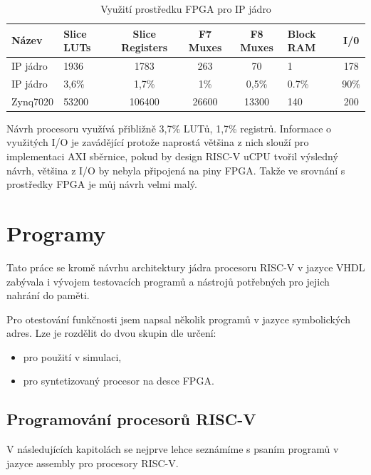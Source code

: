 \documentclass[FM,BP]{tulthesis}
\begin{document}
\begin{table}[h]
    \caption{Využití prostředku FPGA pro IP jádro}
    \label{table:IP_core_resources}
    \begin{center}
        \begin{tabular}{|l|p{1.5cm}|c|c|c|p{1.5cm}|c|}
        \hline
        \textbf{Název} & 
        \textbf{Slice LUTs} & 
        \textbf{Slice Registers} & 
        \textbf{F7 Muxes} & 
        \textbf{F8 Muxes} & 
        \textbf{Block RAM} & 
        \textbf{I/0} \\
        \hline
        IP jádro & 1936 & 1783 & 263 & 70 & 1 & 178 \\
        \hline
        IP jádro & 3,6\% & 1,7\% & 1\% & 0,5\% & 0.7\% & 90\% \\
        \hline
        Zynq7020 & 53200 & 106400 & 26600 & 13300 & 140 & 200\\
        \hline
        \end{tabular}
    \end{center}
\end{table}

Návrh procesoru využívá přibližně 3,7\% LUTů, 1,7\% registrů. Informace o využitých I/O je zavádějící protože naprostá většina z nich slouží pro implementaci AXI sběrnice, pokud by design RISC-V uCPU tvořil výsledný návrh, většina z I/O by nebyla připojená na piny FPGA. Takže ve srovnání s prostředky FPGA je můj návrh velmi malý. 



\chapter{Programy}\label{kap:Programy}
Tato práce se kromě návrhu architektury jádra procesoru RISC-V v jazyce VHDL zabývala i vývojem testovacích programů a nástrojů potřebných pro jejich nahrání do paměti.

Pro otestování funkčnosti jsem napsal několik programů v jazyce symbolických adres. Lze je rozdělit do dvou skupin dle určení:
\begin{itemize}
    \item pro použití v simulaci,
    \item pro syntetizovaný procesor na desce FPGA.
\end{itemize}

\section{Programování procesorů RISC-V}
V následujících kapitolách se nejprve lehce seznámíme s psaním programů v jazyce assembly pro procesory RISC-V.
\end{document}
